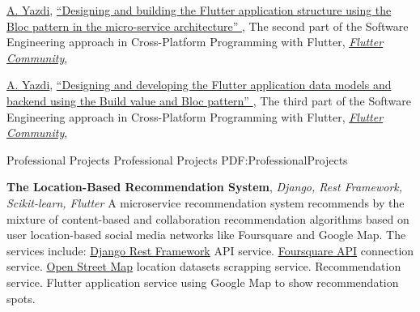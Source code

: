 \documentclass[letterpaper,MMMyyyy,nonstopmode]{resume}
\begin{document}
\begin{Body}
\BigGap
\NumberedItem{[2]}
\href{https://medium.com/@aliyazdi75}
{\underline{A. Yazdi}},
\href{https://medium.com/flutter-community/the-software-engineering-approach-in-cross-platform-programming-with-flutter-part-2-f7b75056102?source=friends_link&sk=79ed6a47bd6fe9b4247f3cc2a113e3df}
{
``Designing and building the Flutter application structure using the Bloc pattern in the micro-service architecture''
},
\newline The second part of the Software Engineering approach in Cross-Platform Programming with Flutter,
\href{https://medium.com/flutter-community}
{\textit{Flutter Community}},

\BigGap
\NumberedItem{[3]}
\href{https://medium.com/@aliyazdi75}
{\underline{A. Yazdi}},
\href{https://medium.com/flutter-community/the-software-engineering-approach-in-cross-platform-programming-with-flutter-part-3-34c6eff02af0?source=friends_link&sk=a34a4a71f306e81b868fd6865abb6aaa}
{
``Designing and developing the Flutter application data models and backend using the Build value and Bloc pattern''
},
\newline The third part of the Software Engineering approach in Cross-Platform Programming with Flutter,
\href{https://medium.com/flutter-community}
{\textit{Flutter Community}},

\endgroup




\Section
{Professional\newline
Projects}
{Professional Projects}
{PDF:ProfessionalProjects}

\BulletItem
\textbf{The Location-Based Recommendation System},
\textit{\small{Django, Rest Framework, Scikit-learn, Flutter}}
\hfill
{\normalsize{
\href{https://github.com/aliyazdi75/Resume/raw/main/BScThesis-Abstract.pdf}
{\faFilePdf}
}}
\Item
A micro­service recommendation system recommends by the mixture of content­-based and collaboration recommendation algorithms based on user location­-based social media networks like Foursquare and Google Map. The services include:
\SubBulletItem
\href{https://www.django-rest-framework.org}{Django Rest Framework} API service.
\SubBulletItem
\href{https://developer.foursquare.com}{Foursquare API} connection service.
\SubBulletItem
\href{https://osm-internal.download.geofabrik.de}{Open Street Map} location datasets scrapping service.
\SubBulletItem
Recommendation service.
\SubBulletItem
Flutter application service using Google Map to show recommendation spots.


\end{Body}
\end{document}

